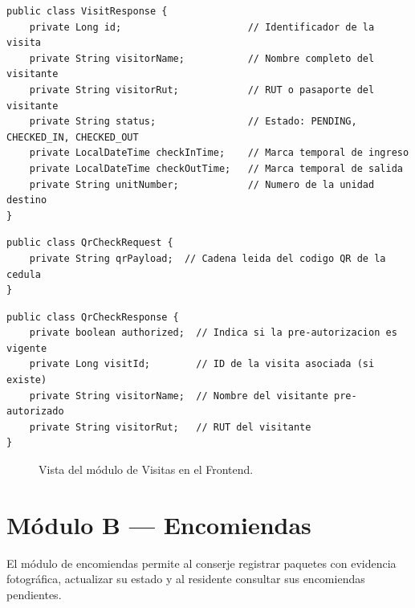 \begin{lstlisting}[style=javadto, title={\texttt{VisitResponse}}]
public class VisitResponse {
    private Long id;                      // Identificador de la visita
    private String visitorName;           // Nombre completo del visitante
    private String visitorRut;            // RUT o pasaporte del visitante
    private String status;                // Estado: PENDING, CHECKED_IN, CHECKED_OUT
    private LocalDateTime checkInTime;    // Marca temporal de ingreso
    private LocalDateTime checkOutTime;   // Marca temporal de salida
    private String unitNumber;            // Numero de la unidad destino
}
\end{lstlisting}

\begin{lstlisting}[style=javadto, title={\texttt{QrCheckRequest}}]
public class QrCheckRequest {
    private String qrPayload;  // Cadena leida del codigo QR de la cedula
}
\end{lstlisting}

\begin{lstlisting}[style=javadto, title={\texttt{QrCheckResponse}}]
public class QrCheckResponse {
    private boolean authorized;  // Indica si la pre-autorizacion es vigente
    private Long visitId;        // ID de la visita asociada (si existe)
    private String visitorName;  // Nombre del visitante pre-autorizado
    private String visitorRut;   // RUT del visitante
}
\end{lstlisting}

\begin{figure}[H]
  \centering
  \caption{Vista del módulo de Visitas en el Frontend.}
  \label{fig:anexo-visitas-frontend}
\end{figure}

\section{Módulo B --- Encomiendas}

El módulo de encomiendas permite al conserje registrar paquetes con evidencia fotográfica, actualizar su estado y al residente consultar sus encomiendas pendientes.

